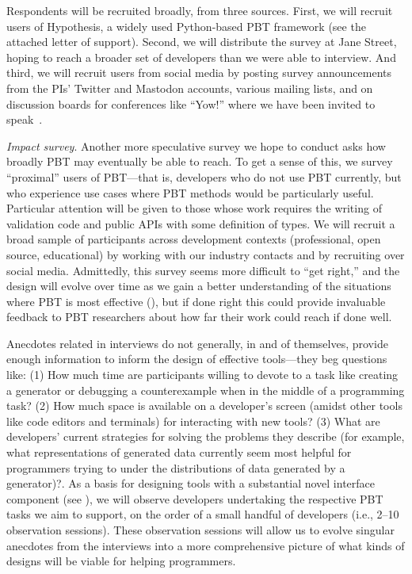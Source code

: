 Respondents will
be recruited broadly, from three sources. First, we will recruit
users of Hypothesis, a widely used Python-based PBT
framework
(see the attached letter of support).
Second, we will distribute the survey at Jane Street, hoping to reach
a broader set of developers than we were able to interview.
And third, we will recruit users from social media by posting
survey announcements from the PIs' Twitter and Mastodon
accounts, various mailing lists, and on discussion boards for conferences like
``Yow!'' where we have been invited to speak~\cite{noauthor_when_nodate}.

\emph{Impact survey}. Another more speculative survey we hope to conduct asks
how broadly PBT may eventually be able to reach.  To get a sense of this, we
survey ``proximal'' users of PBT---that is, developers who do not use PBT
currently, but who experience use cases where PBT methods would be particularly
useful.  Particular attention will be given to those whose work requires the
writing of validation code and public APIs with some definition of types. We
will recruit a broad sample of participants across development contexts
(professional, open source, educational) by working with our industry contacts
and by recruiting over social media. Admittedly, this survey seems more
difficult to ``get right,'' and the design will evolve over time as we gain a
better understanding of the situations where PBT is most effective
(), but if done right this could provide invaluable
feedback to PBT researchers about how far their work could reach if done well.


Anecdotes related in interviews do not generally, in and of
themselves, provide enough information to inform the design of
effective tools---they beg questions like: (1) How much time
are participants willing to devote to
a task like creating a generator or debugging a counterexample when in the
middle of a programming task? (2) How much space is available on a developer's
screen (amidst other tools like code editors and terminals) for
interacting with new
tools? (3) What are developers' current strategies for solving the
problems they describe
(for example, what representations of generated data currently seem most helpful
for programmers trying to under the distributions of data generated by a
generator)?.  As a basis for designing tools with a substantial novel interface
component (see ), we will observe developers
undertaking the respective PBT tasks we
aim to support, on the order of a small handful of developers (i.e., 2--10
observation sessions). These observation sessions will allow us to evolve
singular anecdotes from the interviews into a more comprehensive picture of
what kinds of designs will be viable for helping programmers.

